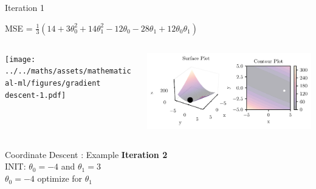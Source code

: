 \documentclass{beamer}
\begin{document}
\begin{frame}{Iteration 1}

MSE = $\frac{1}{3}(14+3\theta_{0}^{2}+14\theta_{1}^{2}-12\theta_{0}-28\theta_{1}+12\theta_{0}\theta_{1})$\\

\begin{columns}
\begin{column}{0.6\textwidth}
\begin{adjustbox}{max totalsize={\textwidth},center}
\texttt{[image: ../../maths/assets/mathematical-ml/figures/gradient descent-1.pdf]}
\end{adjustbox}

\end{column}
\begin{column}{0.5\textwidth}
\begin{adjustbox}{max totalsize={\textwidth},center}
\includegraphics[width=\textwidth]{../../maths/assets/mathematical-ml/figures/contour-linreg-1.pdf}
\end{adjustbox}
\end{column}
\end{columns}


\end{frame}

\begin{frame}{Coordinate Descent : Example}
\textbf{Iteration 2}\\
\vspace{0.5cm}
INIT: $\theta_{0} = -4$ and  $\theta_{1}  = 3$\\

\vspace{0.5cm}
$\theta_0 = -4$ optimize for $\theta_{1}$\\ 


\end{frame}
\end{document}
